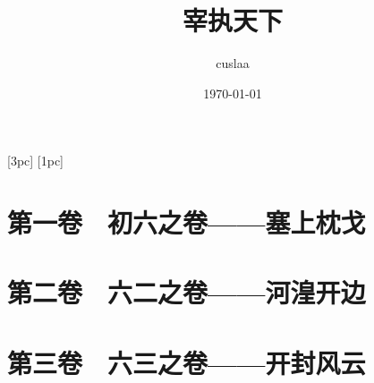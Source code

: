 \documentclass[a4paper,UTF8]{ctexbook}
\begin{document}
\begin{CJK*}{UTF8}{song}

\titleformat{\chapter}{\centering\Huge\bfseries}{}{1em}{}
\titleformat{\section}{\centering\Huge\bfseries}{}{1em}{}
[3pc]{\addvspace{1.5pc}\filcenter}{}{\huge}{}
[1pc]{\addvspace{1.5pc}}{}{\huge}{\hspace{.5em}\titlerule*[10pt]{$\cdot$}\thecontentspage}

\renewcommand{\chaptername}{}
\renewcommand{\contentsname}{目\quad 录}

\setlength{\parindent}{2em}
\setlength{\parskip}{1.3em}
\linespread{1.5}


\title{\Huge 宰执天下}
\author{cuslaa}
\date{\today}
\maketitle

\setcounter{tocdepth}{2}
\tableofcontents




\chapter{第一卷　初六之卷——塞上枕戈}


% 
% 
% 

\chapter{第二卷　六二之卷——河湟开边}


% 
% 
% 

\chapter{第三卷　六三之卷——开封风云}


% 
% 
% 


\end{CJK*}
\end{document}
